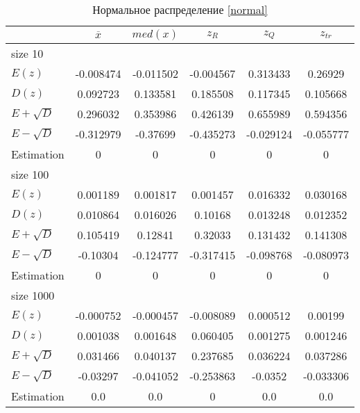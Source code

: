 \documentclass[12pt,a4paper]{article}
\begin{document}
\begin{table}[H]
    \centering
    \begin{tabular}{|l||c|c|c|c|c|}
        \hline
        & $\overline{x}$ & $med(x)$ & $z_R$ & $z_Q$ & $z_{tr}$\\\hline\hline
        size 10 & & & & &\\\hline
        $E(z)$ & -0.008474 & -0.011502 & -0.004567 & 0.313433 & 0.26929 \\\hline
        $D(z)$ & 0.092723 & 0.133581 & 0.185508 & 0.117345 & 0.105668 \\\hline
        $E + \sqrt D$ & 0.296032 & 0.353986 & 0.426139 & 0.655989 & 0.594356 \\\hline
        $E - \sqrt D$ & -0.312979 & -0.37699 & -0.435273 & -0.029124 & -0.055777 \\\hline
        Estimation & 0 & 0 & 0 & 0 & 0 \\\hline
        size 100 & & & & &\\\hline
        $E(z)$ & 0.001189 & 0.001817 & 0.001457 & 0.016332 & 0.030168 \\\hline
        $D(z)$ & 0.010864 & 0.016026 & 0.10168 & 0.013248 & 0.012352 \\\hline
        $E + \sqrt D$ & 0.105419 & 0.12841 & 0.32033 & 0.131432 & 0.141308 \\\hline
        $E - \sqrt D$ & -0.10304 & -0.124777 & -0.317415 & -0.098768 & -0.080973 \\\hline
        Estimation & 0 & 0 & 0 & 0 & 0 \\\hline
        size 1000 & & & & &\\\hline
        $E(z)$ & -0.000752 & -0.000457 & -0.008089 & 0.000512 & 0.00199 \\\hline
        $D(z)$ & 0.001038 & 0.001648 & 0.060405 & 0.001275 & 0.001246 \\\hline
        $E + \sqrt D$ & 0.031466 & 0.040137 & 0.237685 & 0.036224 & 0.037286 \\\hline
        $E - \sqrt D$ & -0.03297 & -0.041052 & -0.253863 & -0.0352 & -0.033306 \\\hline
        Estimation & 0.0 & 0.0 & 0 & 0.0 & 0.0 \\\hline
    \end{tabular}
    \caption{Нормальное распределение \eqref{normal}}
    \label{tab:normal}
\end{table}
\end{document}

